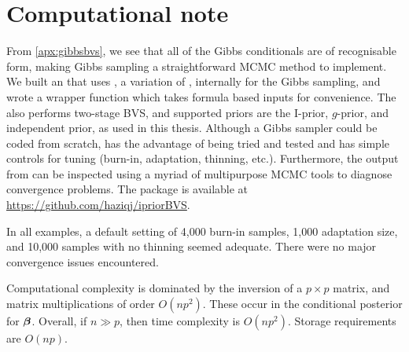 \section{Computational note}

From \cref{apx:gibbsbvs}, we see that all of the Gibbs conditionals are of recognisable form, making Gibbs sampling a straightforward MCMC method to implement.
We built an    that uses  \citep{plummer2003jags}, a variation of , internally for the Gibbs sampling, and wrote a wrapper function which takes formula based inputs for convenience.
The  also performs two-stage BVS, and supported priors are the I-prior, $g$-prior, and independent prior, as used in this thesis.
Although a Gibbs sampler could be coded from scratch,  has the advantage of being tried and tested and has simple controls for tuning (burn-in, adaptation, thinning, etc.).
Furthermore, the output from  can be inspected using a myriad of multipurpose MCMC tools to diagnose convergence problems.
The  package is available at \url{https://github.com/haziqj/ipriorBVS}.

In all examples, a default setting of 4,000 burn-in samples, 1,000 adaptation size, and 10,000 samples with no thinning seemed adequate.
There were no major convergence issues encountered.

Computational complexity is dominated by the inversion of a $p \times p$ matrix, and matrix multiplications of order $O(np^2)$.
These occur in the conditional posterior for ${\bm\beta}$.
Overall, if $n \gg p$, then time complexity is $O(np^2)$.
Storage requirements are $O(np)$.
